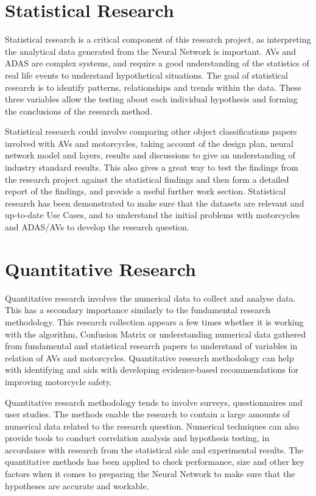 \documentclass[12pt]{report} %
\begin{document}
	\section{Statistical Research}
		Statistical research is a critical component of this research project, as interpreting the analytical data generated from the Neural Network is important. AVs and ADAS are complex systems, and require a good understanding of the statistics of real life events to understand hypothetical situations. The goal of statistical research is to identify patterns, relationships and trends within the data. These three variables allow the testing about each individual hypothesis and forming the conclusions of the research method.

		Statistical research could involve comparing other object classifications papers involved with AVs and motorcycles, taking account of the design plan, neural network model and layers, results and discussions to give an understanding of industry standard results. This also gives a great way to test the findings from the research project against the statistical findings and then form a detailed report of the findings, and provide a useful further work section. Statistical research has been demonstrated to make sure that the datasets are relevant and up-to-date Use Cases, and to understand the initial problems with motorcycles and ADAS/AVs to develop the research question.

	\section{Quantitative Research}
		Quantitative research involves the numerical data to collect and analyse data. This has a secondary importance similarly to the fundamental research methodology. This research collection appears a few times whether it is working with the algorithm, Confusion Matrix or understanding numerical data gathered from fundamental and statistical research papers to understand of variables in relation of AVs and motorcycles. Quantitative research methodology can help with identifying and aids with developing evidence-based recommendations for improving motorcycle safety.

		Quantitative research methodology tends to involve surveys, questionnaires and user studies. The methods enable the research to contain a large amounts of numerical data related to the research question. Numerical techniques can also provide tools to conduct correlation analysis and hypothesis testing, in accordance with research from the statistical side and experimental results. The quantitative methods has been applied to check performance, size and other key factors when it comes to preparing the Neural Network to make sure that the hypotheses are accurate and workable.
\end{document}
